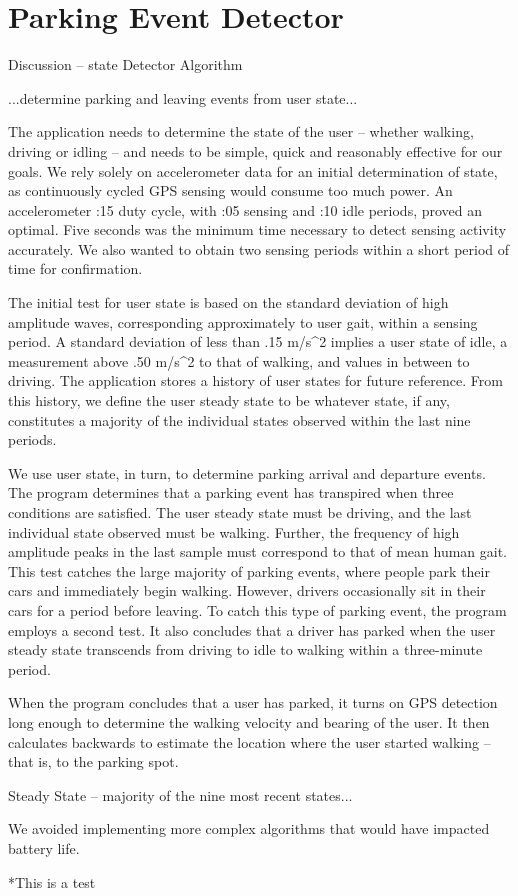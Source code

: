 \section{Parking Event Detector}
\label{sec-detector}

Discussion -- state Detector Algorithm


...determine parking and leaving events from user state...

The application needs to determine the state of the user -- whether walking, driving or idling – and needs to be simple, quick and reasonably effective for our goals.  We rely solely on accelerometer data for an initial determination of state, as continuously cycled GPS sensing would consume too much power.  An accelerometer :15 duty cycle, with :05 sensing and :10 idle periods, proved an optimal.  Five seconds was  the minimum time necessary to detect sensing activity accurately.  We also wanted to obtain two sensing periods within a short period of time for confirmation.

The initial test for user state is based on the standard deviation of high amplitude waves, corresponding approximately to user gait, within a sensing period.  A standard deviation of less than .15 m/s^2 implies a user state of idle, a measurement above .50 m/s^2 to that of walking, and values in between to driving.  The application stores a history of user states for future reference.  From this history, we define the user steady state to be whatever state, if any, constitutes a majority of the individual states observed within the last nine periods.

We use user state, in turn, to determine parking arrival and departure events.  The program determines that a parking event has transpired when three conditions are satisfied.  The user steady state must be driving, and the last individual state observed must be walking.  Further, the frequency of high amplitude peaks in the last sample must correspond to that of mean human gait.  This test catches the large majority of parking events, where people park their cars and immediately begin walking.  However, drivers occasionally sit in their cars for a period before leaving.  To catch this type of parking event, the program employs a second test.  It also concludes that a driver has parked when the user steady state transcends from driving to idle to walking within a three-minute period.

When the program concludes that a user has parked, it turns on GPS detection long enough to determine the walking velocity and bearing of the user.  It then calculates backwards to estimate the location where the user started walking – that is, to the parking spot.

Steady State – majority of the nine most recent states...

We avoided implementing more complex algorithms that would have impacted battery life.

*This is a test  


